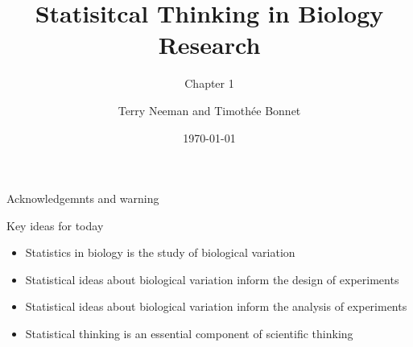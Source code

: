 \documentclass{beamer}
\title{Statisitcal Thinking in Biology Research}
\subtitle{Chapter 1}
\author{Terry Neeman and Timoth\'ee Bonnet}
\date{\today}
\begin{document}



\begin{frame}{}
\maketitle

\end{frame}

\begin{frame}{Acknowledgemnts and warning}

\end{frame}

\begin{frame}{Key ideas for today}

\begin{itemize}[<+->]
 \item Statistics in biology is the study of biological variation
 \item Statistical ideas about biological variation inform the design of experiments
 \item Statistical ideas about biological variation inform the analysis of experiments
 \item Statistical thinking is an essential component of scientific thinking
\end{itemize}

\end{frame}
\end{document}

